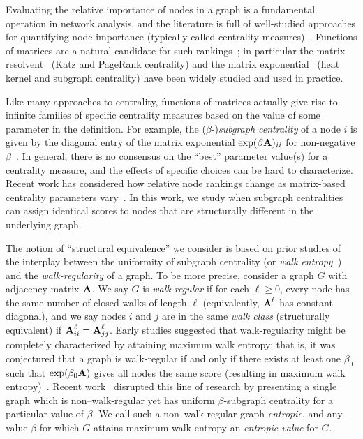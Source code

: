 Evaluating the relative importance of nodes in a graph is a fundamental operation in network analysis, and the literature is full of well-studied approaches for quantifying node importance (typically called centrality measures)~\cite{estrada2012structure,newman2010networks}.
Functions of matrices are a natural candidate for such rankings~\cite{estrada2010network}; in particular the matrix resolvent~\cite{gleich2015pagerank,katz1953new,page1999pagerank} (Katz and PageRank centrality) and the matrix exponential~\cite{benzi2013total,benzi2014matrix,chung2007heat,estrada2005subgraph} (heat kernel and subgraph centrality) have been widely studied and used in practice.

Like many approaches to centrality, functions of matrices actually give rise to infinite families of specific centrality measures based on the value of some parameter in the definition.
For example, the ($\beta$-)\emph{subgraph centrality} of a node $i$ is given by the diagonal entry of the matrix exponential $\exp(\beta \textbf{A})_{ii}$ for non-negative $\beta$~\cite{estrada2005subgraph}.
In general, there is no consensus on the ``best'' parameter value(s) for a centrality measure, and the effects of specific choices can be hard to characterize.
Recent work has considered how relative node rankings change as matrix-based centrality
parameters vary~\cite{benzi2015limiting,paton2017centrality}.
In this work, we study when subgraph centralities can assign identical scores to nodes that are structurally different in the underlying graph.

The notion of ``structural equivalence'' we consider is based on prior studies of the interplay between the uniformity of subgraph centrality (or \emph{walk entropy}~\cite{benzi2014note,estrada2014walk}) and the \emph{walk-regularity} of a graph.
To be more precise, consider a graph $G$ with adjacency matrix $\textbf{A}$.
We say $G$ is \emph{walk-regular} if for each $\ell \geq 0$, every node has the same number of closed walks of length $\ell$ (equivalently, $\textbf{A}^{\ell}$ has constant diagonal), and we say nodes $i$ and $j$ are in the same \emph{walk class} (structurally equivalent) if $\textbf{A}^{\ell}_{ii} = \textbf{A}^{\ell}_{jj}$.
Early studies suggested that walk-regularity might be completely characterized by attaining maximum walk entropy;
that is, it was conjectured that a graph is walk-regular if and only if there exists at least one $\beta_0$ such that $\exp(\beta_0 \textbf{A})$ gives all nodes the same score (resulting in maximum walk entropy)~\cite{benzi2014note}.
Recent work~\cite{Kloster2018115} disrupted this line of research by presenting a single graph which is non--walk-regular yet has uniform $\beta$-subgraph centrality for a particular value of $\beta$.
We call such a non--walk-regular graph \emph{entropic}, and any value $\beta$ for which $G$ attains maximum walk entropy an \emph{entropic value} for $G$.

